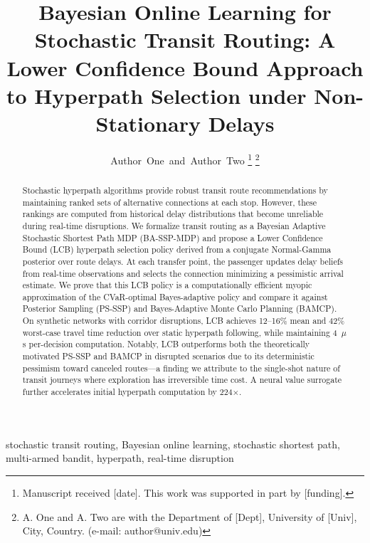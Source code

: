 \documentclass[journal]{IEEEtran}
\begin{document}
\title{Bayesian Online Learning for Stochastic Transit Routing: A Lower Confidence Bound Approach to Hyperpath Selection under Non-Stationary Delays}

\author{Author~One~and~Author~Two%
\thanks{Manuscript received [date]. This work was supported in part by [funding].}%
\thanks{A. One and A. Two are with the Department of [Dept], University of [Univ], City, Country. (e-mail: author@univ.edu)}%
}


\maketitle

\begin{abstract}
Stochastic hyperpath algorithms provide robust transit route recommendations by maintaining ranked sets of alternative connections at each stop. However, these rankings are computed from historical delay distributions that become unreliable during real-time disruptions. We formalize transit routing as a Bayesian Adaptive Stochastic Shortest Path MDP (BA-SSP-MDP) and propose a Lower Confidence Bound (LCB) hyperpath selection policy derived from a conjugate Normal-Gamma posterior over route delays. At each transfer point, the passenger updates delay beliefs from real-time observations and selects the connection minimizing a pessimistic arrival estimate. We prove that this LCB policy is a computationally efficient myopic approximation of the CVaR-optimal Bayes-adaptive policy and compare it against Posterior Sampling (PS-SSP) and Bayes-Adaptive Monte Carlo Planning (BAMCP). On synthetic networks with corridor disruptions, LCB achieves 12--16\% mean and 42\% worst-case travel time reduction over static hyperpath following, while maintaining 4~$\mu$s per-decision computation. Notably, LCB outperforms both the theoretically motivated PS-SSP and BAMCP in disrupted scenarios due to its deterministic pessimism toward canceled routes---a finding we attribute to the single-shot nature of transit journeys where exploration has irreversible time cost. A neural value surrogate further accelerates initial hyperpath computation by 224$\times$.
\end{abstract}

\begin{IEEEkeywords}
stochastic transit routing, Bayesian online learning, stochastic shortest path, multi-armed bandit, hyperpath, real-time disruption
\end{IEEEkeywords}
\end{document}
